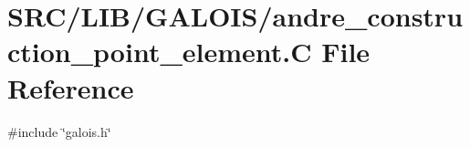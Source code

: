 \hypertarget{andre__construction__point__element_8_c}{}\section{S\+R\+C/\+L\+I\+B/\+G\+A\+L\+O\+I\+S/andre\+\_\+construction\+\_\+point\+\_\+element.C File Reference}
\label{andre__construction__point__element_8_c}
{\ttfamily \#include \char`\"{}galois.\+h\char`\"{}}\newline
